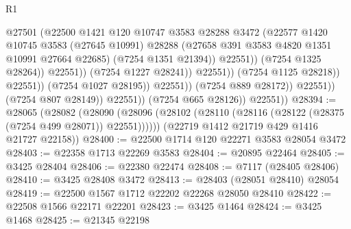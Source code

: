 \begin{lexlean}{R1}
\begin{coremodule}
                                                @27501
                                                (@22500
                                                  @1421
                                                  @120
                                                  @10747
                                                  @3583
                                                  @28288
                                                  @3472
                                                  (@22577
                                                    @1420
                                                    @10745
                                                    @3583
                                                    (@27645 @10991)
                                                    @28288
                                                    (@27658
                                                      @391
                                                      @3583
                                                      @4820
                                                      @1351
                                                      @10991
                                                      @27664
                                                      @22685)
                                                    (@7254 @1351 @21394))
                                                  @22551))
                                              (@7254 @1325 @28264))
                                            @22551))
                                        (@7254 @1227 @28241))
                                      @22551))
                                  (@7254 @1125 @28218))
                                @22551))
                            (@7254 @1027 @28195))
                          @22551))
                      (@7254 @889 @28172))
                    @22551))
                (@7254 @807 @28149))
              @22551))
          (@7254 @665 @28126))
        @22551))
@28394 := @28065
    (@28082
      (@28090 (@28096 (@28102 (@28110 (@28116 (@28122 (@28375 (@7254 @499 @28071)) @22551))))))
      (@22719 @1412 @21719 @429 @1416 @21727 @22158))
@28400 := @22500 @1714 @120 @22271 @3583 @28054 @3472
@28403 := @22358 @1713 @22269 @3583
@28404 := @20895 @22464
@28405 := @3425 @28404
@28406 := @22380 @22474
@28408 := @7117 (@28405 @28406)
@28410 := @3425 @28408 @3472
@28413 := @28403 (@28051 @28410) @28054
@28419 := @22500 @1567 @1712 @22202 @22268 @28050 @28410
@28422 := @22508 @1566 @22171 @22201
@28423 := @3425 @1464
@28424 := @3425 @1468
@28425 := @21345 @22198

\end{coremodule}
\end{lexlean}
